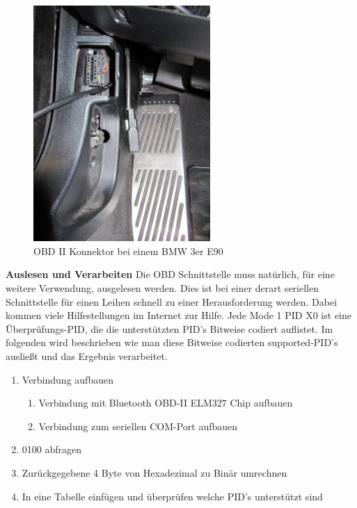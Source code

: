 \begin{figure}[!htb]\centering
	\includegraphics[width=0.6\textwidth]{images/3erobd}
	\caption{OBD II Konnektor bei einem BMW 3er E90 \cite{SIMR.CH2-obd2.3erOBD}}\label{Fig:Data3}
\end{figure}

\textbf{Auslesen und Verarbeiten\nextline}
Die OBD Schnittstelle muss natürlich, für eine weitere Verwendung,  ausgelesen werden. Dies ist bei einer derart seriellen Schnittstelle für einen Leihen schnell zu einer Herausforderung werden. Dabei kommen viele Hilfestellungen im Internet zur Hilfe. Jede Mode 1 PID X0 ist eine Überprüfungs-PID, die die unterstützten PID's Bitweise codiert auflistet. Im folgenden wird beschrieben wie man diese Bitweise codierten supported-PID's ausließt und das Ergebnis verarbeitet.

\begin{enumerate}
	\item Verbindung aufbauen
	\begin{enumerate}
		\item Verbindung mit Bluetooth OBD-II ELM327 Chip aufbauen
		\item Verbindung zum seriellen COM-Port aufbauen 
	\end{enumerate}
	\item 0100 abfragen
	\item Zurückgegebene 4 Byte von Hexadezimal zu Binär umrechnen
	\item In eine Tabelle einfügen und überprüfen welche PID's unterstützt sind
\end{enumerate}

